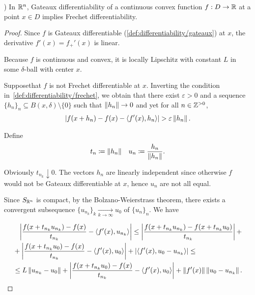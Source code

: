\begin{theorem}\label{thm:rn_continuous_convex_gateaux_implies_frechet}\cite[exercise 1.15(a]{Phelps1993})
  In $\mathbb R^n$, Gateaux differentiability of a continuous convex function $f: D \to \mathbb R$ at a point $x \in D$ implies Frechet differentiability.
\end{theorem}
\begin{proof}
  Since $f$ is Gateaux differentiable (\cref{def:differentiability/gateaux}) at $x$, the derivative $f'(x) = f_+'(x)$ is linear.

  Because $f$ is continuous and convex, it is locally Lipschitz with constant $L$ in some $\delta$-ball with center $x$.

  Suppose\LEM that $f$ is not Frechet differentiable at $x$. Inverting the condition in~\cref{def:differentiability/frechet}, we obtain that there exist $\varepsilon > 0$ and a sequence $\{ h_n \}_n \subseteq B(x, \delta) \setminus \{ 0 \}$ such that $\left\Vert h_n \right\Vert \to 0$ and yet for all $n \in \mathbb Z^{>0}$,
  \begin{align}\label{thm:rn_continuous_convex_gateaux_implies_frechet/frechet_assumption}
    \left\vert f(x + h_n) - f(x) - \left\langle f'(x), h_n \right\rangle \right\vert > \varepsilon \left\Vert h_n \right\Vert.
  \end{align}

  Define
  \begin{align*}
    t_n \coloneqq \left\Vert h_n \right\Vert
    &&
    u_n \coloneqq \frac{h_n} {\left\Vert h_n \right\Vert}.
  \end{align*}

  Obviously $t_{n_k} \downarrow 0$. The vectors $h_n$ are linearly independent since otherwise $f$ would not be Gateaux differentiable at $x$, hence $u_n$ are not all equal.

  Since $S_{\mathbb R^n}$ is compact\USC, by the Bolzano-Weierstrass theorem, there exists a convergent subsequence $\{ u_{n_k} \}_k \underset {k \to \infty} \to u_0$ of $\{ u_n \}_n$. We have

  \begin{align}\label{thm:rn_continuous_convex_gateaux_implies_frechet/frechet_estimate}
    &\phantom= \Abs{\frac {f(x + t_{n_k} u_{n_k}) - f(x)} {t_{n_k}} - \Prod{f'(x)} {u_{n_k}}}
    \leq \nonumber
    \Abs{\frac {f(x + t_{n_k} u_{n_k}) - f(x + t_{n_k} u_0)} {t_{n_k}}} + \\ &+ \Abs{\frac {f(x + t_{n_k} u_0) - f(x)} {t_{n_k}} - \Prod{f'(x)} {u_0}} + \Abs{\Prod{f'(x)} {u_0 - u_{n_k}}}
    \leq \nonumber \\ &\leq
    L \Norm{u_{n_k} - u_0} + \Abs{\frac {f(x + t_{n_k} u_0) - f(x)} {t_{n_k}} - \Prod{f'(x)} {u_0}} + \Norm{f'(x)} \Norm{u_0 - u_{n_k}}.
  \end{align}


\end{proof}
